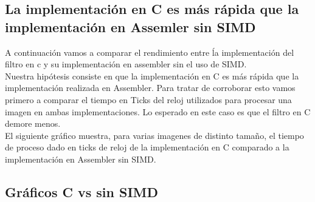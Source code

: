 \subsection{La implementación en C es más rápida que la implementación en Assemler sin SIMD}
 A continuación vamos a comparar el rendimiento entre ĺa implementación del filtro en c y su implementación en assembler sin el uso de SIMD.\\
 Nuestra hipótesis consiste en que la implementación en C es más rápida que la implementación realizada en Assembler. Para tratar de corroborar esto vamos primero a comparar el tiempo en Ticks del reloj utilizados para procesar una imagen en ambas implementaciones.  Lo esperado en este caso es que el filtro en C demore menos. \\ 
 El siguiente gráfico muestra, para varias imagenes de distinto tamaño, el tiempo de proceso dado en ticks de reloj de la implementación en C comparado a la implementación en Assembler sin SIMD. \\

 \subsection{Gráficos C vs sin SIMD}

